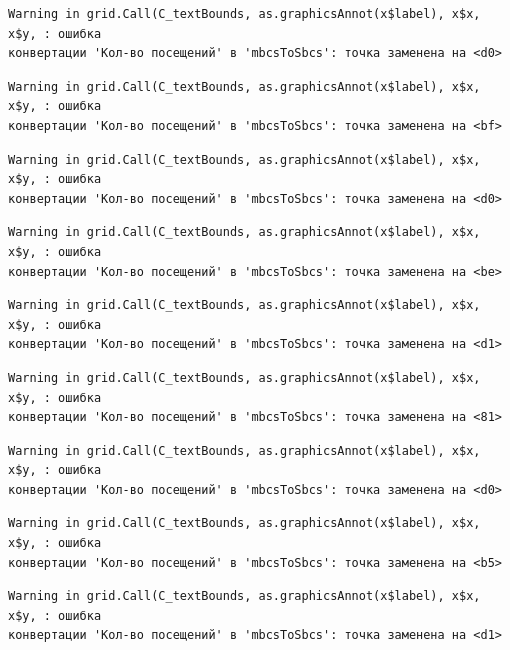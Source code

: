 \documentclass[
  letterpaper,
  DIV=11,
  numbers=noendperiod]{scrreprt}
\begin{document}
\begin{verbatim}
Warning in grid.Call(C_textBounds, as.graphicsAnnot(x$label), x$x, x$y, : ошибка
конвертации 'Кол-во посещений' в 'mbcsToSbcs': точка заменена на <d0>
\end{verbatim}

\begin{verbatim}
Warning in grid.Call(C_textBounds, as.graphicsAnnot(x$label), x$x, x$y, : ошибка
конвертации 'Кол-во посещений' в 'mbcsToSbcs': точка заменена на <bf>
\end{verbatim}

\begin{verbatim}
Warning in grid.Call(C_textBounds, as.graphicsAnnot(x$label), x$x, x$y, : ошибка
конвертации 'Кол-во посещений' в 'mbcsToSbcs': точка заменена на <d0>
\end{verbatim}

\begin{verbatim}
Warning in grid.Call(C_textBounds, as.graphicsAnnot(x$label), x$x, x$y, : ошибка
конвертации 'Кол-во посещений' в 'mbcsToSbcs': точка заменена на <be>
\end{verbatim}

\begin{verbatim}
Warning in grid.Call(C_textBounds, as.graphicsAnnot(x$label), x$x, x$y, : ошибка
конвертации 'Кол-во посещений' в 'mbcsToSbcs': точка заменена на <d1>
\end{verbatim}

\begin{verbatim}
Warning in grid.Call(C_textBounds, as.graphicsAnnot(x$label), x$x, x$y, : ошибка
конвертации 'Кол-во посещений' в 'mbcsToSbcs': точка заменена на <81>
\end{verbatim}

\begin{verbatim}
Warning in grid.Call(C_textBounds, as.graphicsAnnot(x$label), x$x, x$y, : ошибка
конвертации 'Кол-во посещений' в 'mbcsToSbcs': точка заменена на <d0>
\end{verbatim}

\begin{verbatim}
Warning in grid.Call(C_textBounds, as.graphicsAnnot(x$label), x$x, x$y, : ошибка
конвертации 'Кол-во посещений' в 'mbcsToSbcs': точка заменена на <b5>
\end{verbatim}

\begin{verbatim}
Warning in grid.Call(C_textBounds, as.graphicsAnnot(x$label), x$x, x$y, : ошибка
конвертации 'Кол-во посещений' в 'mbcsToSbcs': точка заменена на <d1>
\end{verbatim}
\end{document}
